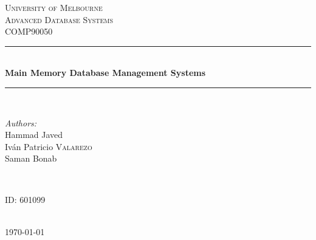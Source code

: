 \documentclass[12pt]{article} %
\begin{document}

\begin{titlepage}

\newcommand{\HRule}{\rule{\linewidth}{0.5mm}} %

\center %

\textsc{\LARGE University of Melbourne}\\[1.5cm] %
\textsc{\Large Advanced Database Systems}\\[0.5cm] %
\textsc{\large COMP90050}\\[0.5cm] %

\HRule \\[0.4cm]
{ \huge \bfseries Main Memory Database Management Systems}\\[0.4cm] %
\HRule \\[1.5cm]

\begin{minipage}{0.4\textwidth}
\begin{flushleft} \large
\emph{Authors:}\\
Hammad Javed\\
Iván Patricio \textsc{Valarezo}\\ %
Saman Bonab\\
\end{flushleft}
\end{minipage}
~
\begin{minipage}{0.4\textwidth}
\begin{flushright} \large
ID: \textsc{601099} %
\end{flushright}
\end{minipage}\\[4cm]

{\large \today}\\[3cm] %


\vfill %

\end{titlepage}
\end{document}

